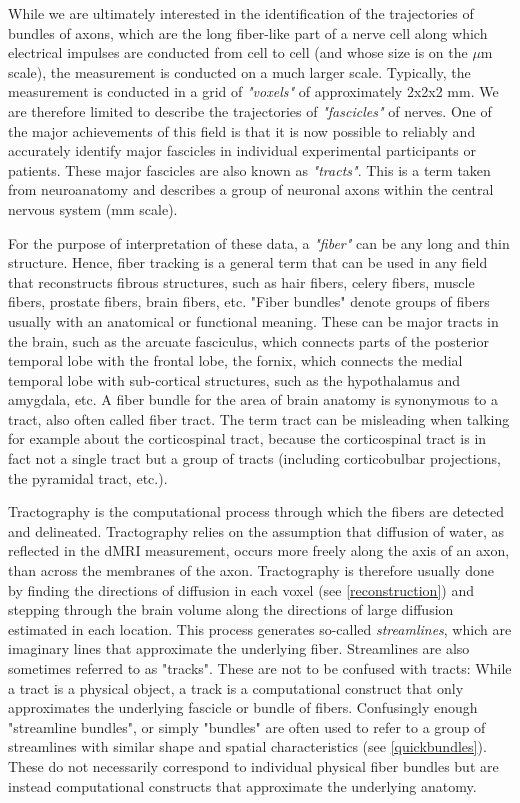 \documentclass{bioinfo}
\begin{document}
While we are ultimately interested in the identification of the trajectories of
bundles of axons, which are the long fiber-like part of a nerve cell along
which electrical impulses are conducted from cell to cell (and whose
size is on the $\mu$m scale), the measurement is conducted on a much larger
scale. Typically, the measurement is conducted in a grid of \emph{"voxels"} of
approximately 2x2x2 mm. We are therefore limited to describe the trajectories
of \emph{"fascicles"} of nerves. One of the major achievements of this
field is that it is now possible to reliably and accurately identify
major fascicles in
individual experimental participants or patients. These major fascicles are
also known as \emph{"tracts"}. This is a term taken from neuroanatomy
and describes a group of neuronal axons within the central nervous
system (mm scale).

For the purpose of interpretation of these data, a \emph{"fiber"} can be any long and
thin structure. Hence, fiber tracking is a general term that can be used in any
field that reconstructs fibrous structures, such as hair fibers, celery fibers,
muscle fibers, prostate fibers, brain fibers, etc. "Fiber bundles" denote
groups of fibers usually with an anatomical or functional meaning. These can be
major tracts in the brain, such as the arcuate fasciculus, which connects parts
of the posterior temporal lobe with the frontal lobe, the fornix, which
connects the medial temporal lobe with sub-cortical structures, such as the
hypothalamus and amygdala, etc. A fiber bundle for the area of brain anatomy is
synonymous to a tract, also often called fiber tract. The term tract can be
misleading when talking for example about the corticospinal tract, because the
corticospinal tract is in fact not a single tract but a group of tracts
(including corticobulbar projections, the pyramidal tract, etc.).

Tractography is the computational process through which the fibers are detected
and delineated. Tractography relies on the assumption that diffusion of water,
as reflected in the dMRI measurement, occurs more freely along the axis of an
axon, than across the membranes of the axon. Tractography is therefore usually
done by finding the directions of diffusion in each voxel (see
\ref{reconstruction}) and stepping through the brain volume along the
directions of large diffusion estimated in each location. This process
generates so-called \emph{streamlines}, which are imaginary lines that approximate the
underlying fiber. Streamlines are also sometimes referred to as "tracks". These
are not to be confused with tracts: While a tract is a physical object, a track
is a computational construct that only approximates the underlying fascicle or
bundle of fibers. Confusingly enough "streamline bundles", or simply "bundles"
are often used to refer to a group of streamlines with similar shape and
spatial characteristics (see \ref{quickbundles}). These do not necessarily
correspond to individual physical fiber bundles but are instead computational
constructs that approximate the underlying anatomy.
\end{document}

